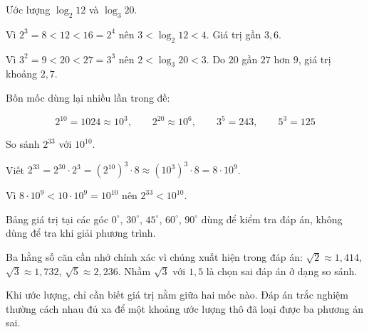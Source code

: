 \documentclass[11pt, a4paper]{article}
\begin{document}
\begin{vidu}[{4}]
Ước lượng $\log_2 12$ và $\log_3 20$.

Vì $2^3 = 8 < 12 < 16 = 2^4$ nên $3 < \log_2 12 < 4$. Giá trị gần $3,6$.

Vì $3^2 = 9 < 20 < 27 = 3^3$ nên $2 < \log_3 20 < 3$. Do $20$ gần $27$ hơn $9$, giá trị khoảng $2,7$.

\begin{dinhly}
Bốn mốc dùng lại nhiều lần trong đề:

$$2^{10} = 1024 \approx 10^3, \qquad 2^{20} \approx 10^6, \qquad 3^5 = 243, \qquad 5^3 = 125$$
\end{dinhly}
\end{vidu}
\begin{vidu}[{5}]
So sánh $2^{33}$ với $10^{10}$.

Viết $2^{33} = 2^{30} \cdot 2^3 = (2^{10})^3 \cdot 8 \approx (10^3)^3 \cdot 8 = 8 \cdot 10^9$.

Vì $8 \cdot 10^9 < 10 \cdot 10^9 = 10^{10}$ nên $2^{33} < 10^{10}$.

\begin{dinhly}
Bảng giá trị tại các góc $0^\circ$, $30^\circ$, $45^\circ$, $60^\circ$, $90^\circ$ dùng để kiểm tra đáp án, không dùng để tra khi giải phương trình.


 Ba hằng số căn cần nhớ chính xác vì chúng xuất hiện trong đáp án: $\sqrt{2} \approx 1,414$, $\sqrt{3} \approx 1,732$, $\sqrt{5} \approx 2,236$. Nhầm $\sqrt{3}$ với $1,5$ là chọn sai đáp án ở dạng so sánh.

 Khi ước lượng, chỉ cần biết giá trị nằm giữa hai mốc nào. Đáp án trắc nghiệm thường cách nhau đủ xa để một khoảng ước lượng thô đã loại được ba phương án sai.

\end{dinhly}
\end{vidu}
\end{document}
